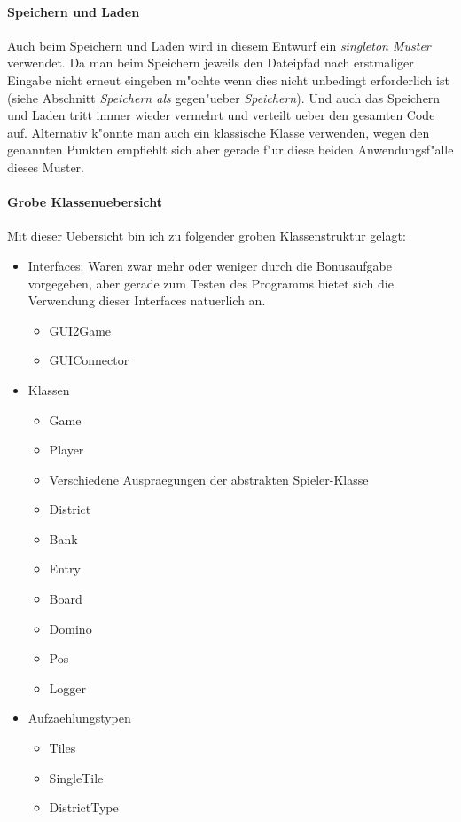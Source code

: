 \paragraph{Speichern und Laden}
Auch beim Speichern und Laden wird in diesem Entwurf ein \emph{singleton Muster} verwendet. Da man beim Speichern jeweils den Dateipfad nach erstmaliger Eingabe nicht erneut eingeben m"ochte wenn dies nicht unbedingt erforderlich ist (siehe Abschnitt 
\emph{Speichern als} gegen"ueber \emph{Speichern}). Und auch das Speichern und Laden tritt immer wieder vermehrt und verteilt ueber den gesamten Code auf. Alternativ k"onnte man auch ein klassische Klasse verwenden, wegen den genannten Punkten empfiehlt sich aber gerade f"ur diese beiden Anwendungsf"alle dieses Muster. 

\paragraph{Grobe Klassenuebersicht}
Mit dieser Uebersicht bin ich zu folgender groben Klassenstruktur gelagt: 
\begin{itemize}
	\item Interfaces: Waren zwar mehr oder weniger durch die Bonusaufgabe vorgegeben, aber gerade zum Testen des Programms bietet sich die Verwendung dieser Interfaces natuerlich an. 
	\begin{itemize}
		\item GUI2Game
		\item GUIConnector
	\end{itemize}
	\item Klassen
	\begin{itemize}
		\item Game
		\item Player
		\item Verschiedene Auspraegungen der abstrakten Spieler-Klasse
		\item District
		\item Bank
		\item Entry
		\item Board
		\item Domino
		\item Pos
		\item Logger
	\end{itemize}
	\item Aufzaehlungstypen
	\begin{itemize}
		\item Tiles
		\item SingleTile
		\item DistrictType
	\end{itemize}
\end{itemize}

